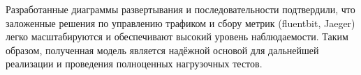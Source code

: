 Разработанные диаграммы развертывания и последовательности подтвердили, что заложенные решения по управлению трафиком и сбору метрик (fluentbit, Jaeger) легко масштабируются и обеспечивают высокий уровень наблюдаемости. Таким образом, полученная модель является надёжной основой для дальнейшей реализации и проведения полноценных нагрузочных тестов.

